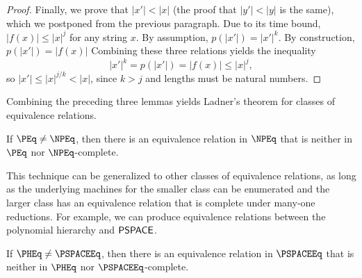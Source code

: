 \begin{proof}
  Finally, we prove that $|x'| < |x|$ (the proof that $|y'| < |y|$ is the same), which we postponed from the previous paragraph.
  Due to its time bound, $|f(x)| \leq |x|^j$ for any string $x$.
  By assumption, $p(|x'|) = |x'|^k$.
  By construction, $p(|x'|) = |f(x)|$
  Combining these three relations yields the inequality
  \begin{equation*}
    |x'|^k = p(|x'|) = |f(x)| \leq |x|^j,
  \end{equation*}
  so $|x'| \leq |x|^{j / k} < |x|$, since $k > j$ and lengths must be natural numbers.
\end{proof}

Combining the preceding three lemmas yields Ladner's theorem for classes of equivalence relations.

\begin{theorem}\label{thm:intermediary}
  If $\PEq \neq \NPEq$, then there is an equivalence relation in $\NPEq$ that is neither in $\PEq$ nor $\NPEq$-complete.
\end{theorem}

This technique can be generalized to other classes of equivalence relations, as long as the underlying machines for the smaller class can be enumerated and the larger class has an equivalence relation that is complete under many-one reductions.
For example, we can produce equivalence relations between the polynomial hierarchy and ${\mathsf{PSPACE}}$.

\begin{corollary}\label{cor:pspace}
  If $\PHEq \neq \PSPACEEq$, then there is an equivalence relation in $\PSPACEEq$ that is neither in $\PHEq$ nor $\PSPACEEq$-complete.
\end{corollary}
